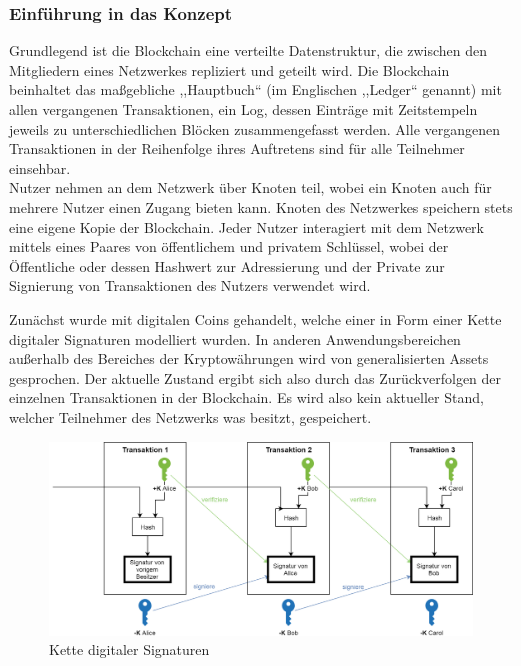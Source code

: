     \subsubsection{Einführung in das Konzept}
    \label{sec:sota_blockchain_introduction}
    Grundlegend ist die Blockchain eine verteilte Datenstruktur, die zwischen den Mitgliedern eines Netzwerkes repliziert und geteilt wird\cite{Christidis2016}.
    Die Blockchain beinhaltet das maßgebliche ,,Hauptbuch`` (im Englischen ,,Ledger`` genannt) mit allen vergangenen Transaktionen, ein Log, dessen Einträge mit Zeitstempeln jeweils zu unterschiedlichen Blöcken zusammengefasst werden. 
    Alle vergangenen Transaktionen in der Reihenfolge ihres Auftretens sind für alle Teilnehmer einsehbar\cite{Nakamoto2008}.
    \medskip\\
    Nutzer nehmen an dem Netzwerk über Knoten teil, wobei ein Knoten auch für mehrere Nutzer einen Zugang bieten kann. 
    Knoten des Netzwerkes speichern stets eine eigene Kopie der Blockchain.
    Jeder Nutzer interagiert mit dem Netzwerk mittels eines Paares von öffentlichem und privatem Schlüssel, wobei der Öffentliche oder dessen Hashwert zur Adressierung und der Private zur Signierung von Transaktionen des Nutzers verwendet wird.\cite{Christidis2016}
    
    Zunächst wurde mit digitalen Coins gehandelt, welche einer in Form einer Kette digitaler Signaturen modelliert wurden\cite{Nakamoto2008}.
    In anderen Anwendungsbereichen außerhalb des Bereiches der Kryptowährungen wird von generalisierten Assets gesprochen.
    Der aktuelle Zustand ergibt sich also durch das Zurückverfolgen der einzelnen Transaktionen in der Blockchain. 
    Es wird also kein aktueller Stand, welcher Teilnehmer des Netzwerks was besitzt, gespeichert.\cite{Christidis2016}
    \begin{figure}[H]
    	\centering
    	\includegraphics[width=\textwidth]{graphics/transaction.png}
    	\caption[Kette digitaler Signaturen]{Kette digitaler Signaturen\cite{Nakamoto2008}}
    	\label{fig:txio}
    \end{figure}
    
